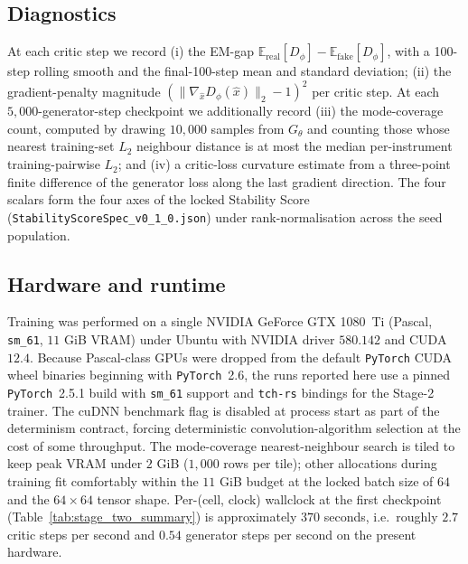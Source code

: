 \subsection*{Diagnostics}
At each critic step we record (i) the EM-gap
$\mathbb{E}_{\text{real}}[D_\phi] -
\mathbb{E}_{\text{fake}}[D_\phi]$, with a 100-step rolling smooth and
the final-100-step mean and standard deviation; (ii) the
gradient-penalty magnitude $(\|\nabla_{\hat{x}} D_\phi(\hat{x})\|_2 -
1)^2$ per critic step. At each $5{,}000$-generator-step checkpoint we
additionally record (iii) the mode-coverage count, computed by drawing
$10{,}000$ samples from $G_\theta$ and counting those whose nearest
training-set $L_2$ neighbour distance is at most the median
per-instrument training-pairwise $L_2$; and (iv) a critic-loss
curvature estimate from a three-point finite difference of the
generator loss along the last gradient direction. The four scalars
form the four axes of the locked Stability Score
(\texttt{StabilityScoreSpec\_v0\_1\_0.json}) under
rank-normalisation across the seed population.

\subsection*{Hardware and runtime}
Training was performed on a single NVIDIA GeForce GTX 1080~Ti
(Pascal, \texttt{sm\_61}, $11$ GiB VRAM) under Ubuntu with NVIDIA
driver $580.142$ and CUDA $12.4$. Because Pascal-class GPUs were
dropped from the default \texttt{PyTorch} CUDA wheel binaries
beginning with \texttt{PyTorch}~2.6, the runs reported here use a
pinned \texttt{PyTorch}~2.5.1 build with \texttt{sm\_61} support and
\texttt{tch-rs} bindings for the Stage-2 trainer. The cuDNN benchmark
flag is disabled at process start as part of the determinism contract,
forcing deterministic convolution-algorithm selection at the cost of
some throughput. The mode-coverage nearest-neighbour search is tiled
to keep peak VRAM under $2$ GiB ($1{,}000$ rows per tile); other
allocations during training fit comfortably within the $11$ GiB budget
at the locked batch size of $64$ and the $64{\times}64$ tensor shape.
Per-(cell, clock) wallclock at the first checkpoint
(Table~\ref{tab:stage_two_summary}) is approximately $370$ seconds,
i.e.\ roughly $2.7$ critic steps per second and $0.54$ generator
steps per second on the present hardware.
